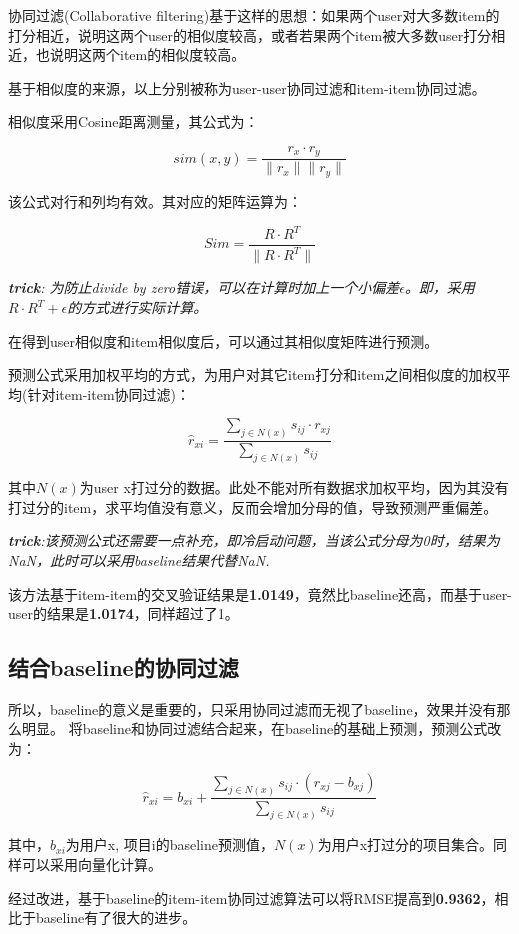 \documentclass[utf8, a4paper, 11pt, onecolumn]{ctexart}
\begin{document}
\begin{spacing}{1.25}
协同过滤(Collaborative filtering)基于这样的思想：如果两个user对大多数item的打分相近，说明这两个user的相似度较高，或者若果两个item被大多数user打分相近，也说明这两个item的相似度较高。

基于相似度的来源，以上分别被称为user-user协同过滤和item-item协同过滤。

相似度采用Cosine距离测量，其公式为：

\[sim(x,y) = \frac{r_x \cdot r_y}{\| r_x \| \| r_y\|}\]

该公式对行和列均有效。其对应的矩阵运算为：

\[Sim = \frac{R \cdot R^T}{\| R\cdot R^T \|}\]

\textit{\textbf{trick}: 为防止divide by zero错误，可以在计算时加上一个小偏差$\epsilon$。即，采用$R\cdot R^T + \epsilon$的方式进行实际计算。}

在得到user相似度和item相似度后，可以通过其相似度矩阵进行预测。

预测公式采用加权平均的方式，为用户对其它item打分和item之间相似度的加权平均(针对item-item协同过滤)：

\[\hat{r}_{xi} = \frac{\sum_{j \in N(x)} s_{ij} \cdot r_{xj}}{\sum_{j \in N(x)} s_{ij}} \]

其中$N(x)$为user x打过分的数据。此处不能对所有数据求加权平均，因为其没有打过分的item，求平均值没有意义，反而会增加分母的值，导致预测严重偏差。

\textit{\textbf{trick}:该预测公式还需要一点补充，即冷启动问题，当该公式分母为0时，结果为NaN，此时可以采用baseline结果代替NaN.}

该方法基于item-item的交叉验证结果是\textbf{1.0149}，竟然比baseline还高，而基于user-user的结果是\textbf{1.0174}，同样超过了1。

\subsection{结合baseline的协同过滤}

所以，baseline的意义是重要的，只采用协同过滤而无视了baseline，效果并没有那么明显。
将baseline和协同过滤结合起来，在baseline的基础上预测，预测公式改为：

\[\hat{r}_{xi} = b_{xi}  + \frac{\sum_{j \in N(x)} s_{ij} \cdot (r_{xj} - b_{xj})}{\sum_{j \in N(x)} s_{ij}} \]

其中，$b_{xi}$为用户x, 项目i的baseline预测值，$N(x)$为用户x打过分的项目集合。同样可以采用向量化计算。

经过改进，基于baseline的item-item协同过滤算法可以将RMSE提高到\textbf{0.9362}，相比于baseline有了很大的进步。


\end{spacing}
\end{document}
